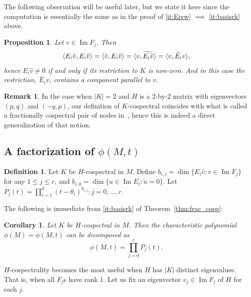 \documentclass[11pt]{article}
\newtheorem{prop}[theo]{Proposition}
\newtheorem{coro}[theo]{Corollary}
\theoremstyle{definition}
\newtheorem{defi}[theo]{Definition}
\newtheorem{rema}[theo]{Remark}
\numberwithin{equation}{section}
\newcommand\+{\mkern2mu}
\newcommand{\1}{\mathbf 1}
\DeclareMathOperator{\im}{Im}
\DeclarePairedDelimiter{\sprod}{\langle}{\rangle}
\begin{document}
The following observation will be useful later, but we state it here since the computation is essentially the same as in the proof of \ref{it:Eivw} $\implies $ \ref{it:basisrk} above.

\begin{prop}\label{claim:nonzeroEv}
Let $v \in \im F_j$. Then 
\[ \sprod{E_i \hat{v}, E_i \hat{v}} = \sprod{\hat{v}, E_i \hat{v}} = \sprod{v, \widetilde{E_i \hat{v}}} = \sprod{ v, \tilde{E_i} v},\]
hence  $E_i \hat{v} \neq 0$ if and only if its restriction to $K$ is non-zero. And in this case the restriction, $\tilde{E_i} v$, contains a component parallel to $v$.
\end{prop}

\begin{rema}\label{rem:equiv_def}
In the case when $|K| = 2$ and $H$ is a 2-by-2 matrix with eigenvectors $(p,q)$ and $(-q, p)$, our definition of $K$-cospectral coincides with what is called a fractionally cospectral pair of nodes in~\cite[Theorem 3.3, condition (ii)]{chan2020fundamentals}, hence this is indeed a direct generalization of that notion. 
\end{rema}

\subsection{A factorization of \texorpdfstring{$\phi(M,t)$}{phi(M,t)}}

\begin{defi}
Let $K$ be $H$-cospectral in $M$. Define $b_{i,j} = \dim \{ E_i \hat{v} : v \in
\im F_j \}$ for any $1 \leq j \leq r$, and $b_{i,0} = \dim \{u \in \im E_i : \tilde{u} = 0\}$.  Let $P_j(t) = \prod_{i=1}^d (t-\theta_i)^{b_{i,j}} : j = 0,\dots, r$. 
\end{defi}


The following is immediate from \ref{it:basisrk} of Theorem~\ref{thm:frac_cosp}:
\begin{coro}\label{cor:phiMfactor}
Let $K$ be $H$-cospectral in $M$. Then the characteristic polynomial $\phi(M) = \phi(M,t)$ can be decomposed as 
\[ \phi(M,t) = \prod_{j=0}^r P_j(t). \]
\end{coro}

$H$-cospectrality becomes the most useful when $H$ has $|K|$ distinct eigenvalues. That is, when all $F_j$s have rank 1. Let us fix an eigenvector $v_j \in \im F_j$ of $H$ for each $j$.  
\end{document}
